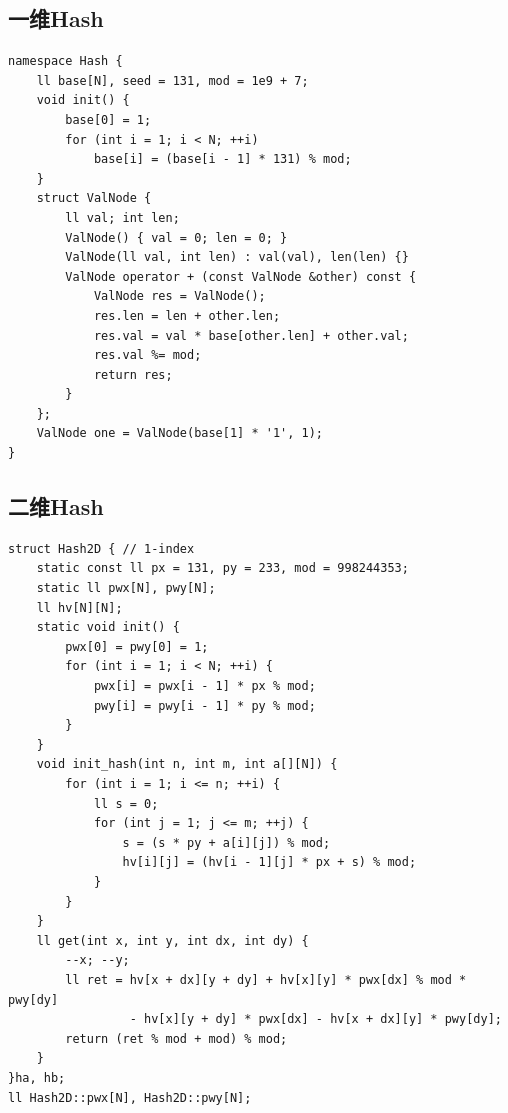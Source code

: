 \subsection{一维Hash}

\begin{lstlisting}
namespace Hash {
	ll base[N], seed = 131, mod = 1e9 + 7; 
	void init() {
		base[0] = 1;
		for (int i = 1; i < N; ++i)
			base[i] = (base[i - 1] * 131) % mod; 
	}
	struct ValNode { 
		ll val; int len;
		ValNode() { val = 0; len = 0; }
		ValNode(ll val, int len) : val(val), len(len) {}
		ValNode operator + (const ValNode &other) const {
			ValNode res = ValNode();
			res.len = len + other.len;
			res.val = val * base[other.len] + other.val;
			res.val %= mod;
			return res;
		}
	};
	ValNode one = ValNode(base[1] * '1', 1);
}
\end{lstlisting}

\subsection{二维Hash}

\begin{lstlisting}
struct Hash2D { // 1-index
    static const ll px = 131, py = 233, mod = 998244353;
    static ll pwx[N], pwy[N];
    ll hv[N][N];
    static void init() {
        pwx[0] = pwy[0] = 1;
        for (int i = 1; i < N; ++i) {
            pwx[i] = pwx[i - 1] * px % mod;
            pwy[i] = pwy[i - 1] * py % mod;
        }
    }
    void init_hash(int n, int m, int a[][N]) {
		for (int i = 1; i <= n; ++i) {
			ll s = 0;
			for (int j = 1; j <= m; ++j) {
                s = (s * py + a[i][j]) % mod;
                hv[i][j] = (hv[i - 1][j] * px + s) % mod;
            }
        }
    }
    ll get(int x, int y, int dx, int dy) {
        --x; --y;
        ll ret = hv[x + dx][y + dy] + hv[x][y] * pwx[dx] % mod * pwy[dy]
                 - hv[x][y + dy] * pwx[dx] - hv[x + dx][y] * pwy[dy];
        return (ret % mod + mod) % mod;
    }
}ha, hb;
ll Hash2D::pwx[N], Hash2D::pwy[N];
\end{lstlisting}

